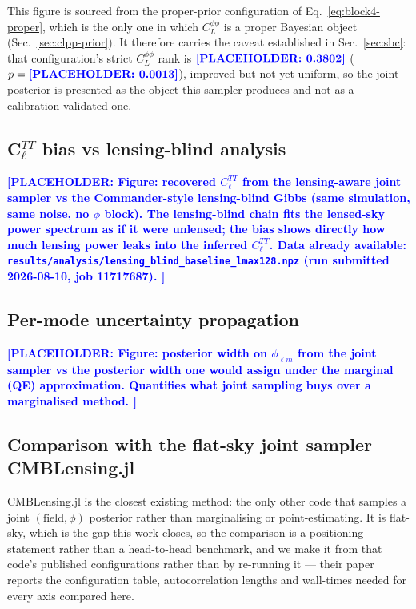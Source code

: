 \documentclass[twocolumn,superscriptaddress,aps,prl,floatfix]{revtex4-2}
\newcommand{\cl}{C_\ell}
\newcommand{\clpp}{C_L^{\phi\phi}}
\newcommand{\placeholder}[1]{\textcolor{blue}{\textbf{[PLACEHOLDER: #1]}}}
\begin{document}
This figure is sourced from the proper-prior configuration of
Eq.~\eqref{eq:block4-proper}, which is the only one in which $\clpp$ is a
proper Bayesian object (Sec.~\ref{sec:clpp-prior}). It therefore carries the
caveat established in Sec.~\ref{sec:sbc}: that configuration's strict $\clpp$
rank is $\placeholder{0.3802}$ ($p = \placeholder{0.0013}$), improved but not
yet uniform, so the joint posterior is presented as the object this sampler
produces and not as a calibration-validated one.

\subsection{C$_\ell^{TT}$ bias vs lensing-blind analysis}
\label{sec:cl-bias}

\placeholder{
Figure: recovered $\cl^{TT}$ from the lensing-aware joint sampler vs the
Commander-style lensing-blind Gibbs (same simulation, same noise, no $\phi$
block). The lensing-blind chain fits the lensed-sky power spectrum as if it were
unlensed; the bias shows directly how much lensing power leaks into the
inferred $\cl^{TT}$.
Data already available: \texttt{results/analysis/lensing\_blind\_baseline\_lmax128.npz}
(run submitted 2026-08-10, job 11717687).
}

\subsection{Per-mode uncertainty propagation}
\label{sec:uncertainty}

\placeholder{
Figure: posterior width on $\phi_{\ell m}$ from the joint sampler vs the
posterior width one would assign under the marginal (QE) approximation.
Quantifies what joint sampling buys over a marginalised method.
}


\subsection{Comparison with the flat-sky joint sampler CMBLensing.jl}
\label{sec:cmblensing}

CMBLensing.jl \citep{CMBLensing,Millea:2020} is the closest existing method:
the only other code that samples a joint $(\text{field}, \phi)$ posterior rather
than marginalising or point-estimating. It is flat-sky, which is the gap this
work closes, so the comparison is a positioning statement rather than a
head-to-head benchmark, and we make it from that code's published
configurations rather than by re-running it --- their paper reports the
configuration table, autocorrelation lengths and wall-times needed for every
axis compared here.
\end{document}
